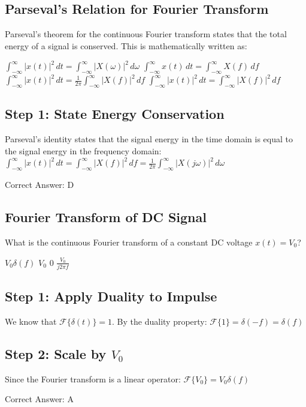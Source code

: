 \clearpage

\subsection{Parseval's Relation for Fourier Transform}

Parseval's theorem for the continuous Fourier transform states that the total energy of a signal is conserved. This is mathematically written as:

\begin{choices}
    \choice $\int_{-\infty}^{\infty} |x(t)|^2\, dt = \int_{-\infty}^{\infty} |X(\omega)|^2\, d\omega$
    \choice $\int_{-\infty}^{\infty} x(t)\, dt = \int_{-\infty}^{\infty} X(f)\, df$
    \choice $\int_{-\infty}^{\infty} |x(t)|^2\, dt = \frac{1}{2\pi} \int_{-\infty}^{\infty} |X(f)|^2\, df$
    \correctchoice $\int_{-\infty}^{\infty} |x(t)|^2\, dt = \int_{-\infty}^{\infty} |X(f)|^2\, df$
\end{choices}

\begin{solution}

\subsection*{Step 1: State Energy Conservation}
Parseval's identity states that the signal energy in the time domain is equal to the signal energy in the frequency domain:
$\int_{-\infty}^{\infty} |x(t)|^2\, dt = \int_{-\infty}^{\infty} |X(f)|^2\, df = \frac{1}{2\pi} \int_{-\infty}^{\infty} |X(j\omega)|^2\, d\omega$

Correct Answer: D
\end{solution}

\clearpage

\subsection{Fourier Transform of DC Signal}

What is the continuous Fourier transform of a constant DC voltage $x(t) = V_0$?

\begin{choices}
    \correctchoice $V_0 \delta(f)$
    \choice $V_0$
    \choice $0$
    \choice $\frac{V_0}{j 2\pi f}$
\end{choices}

\begin{solution}

\subsection*{Step 1: Apply Duality to Impulse}
We know that $\mathcal{F}\{\delta(t)\} = 1$. By the duality property:
$\mathcal{F}\{1\} = \delta(-f) = \delta(f)$

\subsection*{Step 2: Scale by $V_0$}
Since the Fourier transform is a linear operator:
$\mathcal{F}\{V_0\} = V_0 \delta(f)$

Correct Answer: A
\end{solution}

